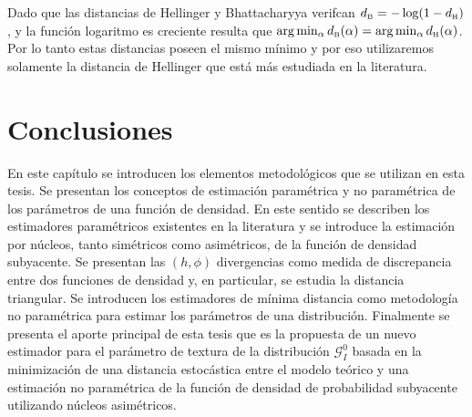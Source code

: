 Dado que las distancias de Hellinger y Bhattacharyya verifcan $d_\text{\tiny B}=-\log(1-d_\text{\tiny H})$, y la función logaritmo es creciente resulta que $\arg\min_\alpha d_\text{\tiny B}(\alpha )=\arg\min_ \alpha d_\text{\tiny H}(\alpha )$. Por lo tanto estas distancias poseen el mismo mínimo y por eso utilizaremos solamente la distancia de Hellinger que está más estudiada en la literatura.

\section{Conclusiones}

En este capítulo se introducen los elementos metodológicos que se utilizan en esta tesis. Se presentan los conceptos de estimación paramétrica y no paramétrica de los parámetros de una función de densidad. En este sentido se describen los estimadores  paramétricos existentes en la literatura y se introduce la estimación por núcleos, tanto simétricos como asimétricos, de la función de densidad subyacente.  Se  presentan las $(h,\phi)$ divergencias como medida de discrepancia entre dos funciones de densidad y, en particular, se estudia la distancia triangular. Se introducen los estimadores de mínima distancia como metodología no paramétrica para estimar los parámetros de una distribución. Finalmente se presenta el aporte principal de esta tesis que es la propuesta de un nuevo estimador para el parámetro de textura de la distribución $\mathcal{G}_I^0$ basada en la minimización de una distancia estocástica entre el modelo teórico y una estimación no paramétrica de la función de densidad de probabilidad subyacente utilizando núcleos asimétricos.